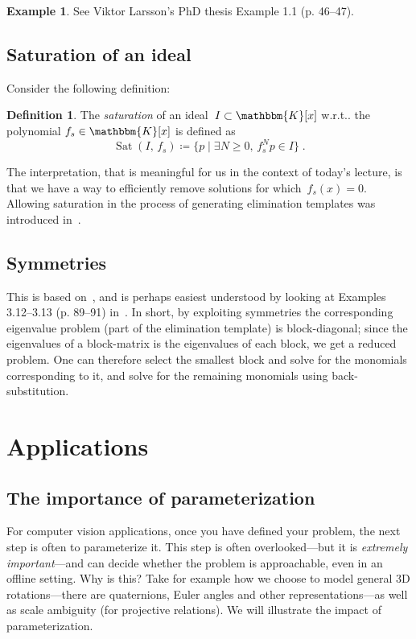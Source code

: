\documentclass[11pt,a4paper]{article}
\makeatletter
\theoremstyle{definition}
\newtheorem{example}{Example}
\newtheorem{definition}{Definition}
\newcommand{\K}{\ensuremath{\mathbbm{K}}}
\DeclareMathOperator{\sat}{Sat}
\DeclareRobustCommand\wrt{w.r.t\@ifnextchar.{}{.\@}}
\makeatother
\begin{document}
\begin{example}
See Viktor Larsson's PhD thesis Example 1.1 (p. 46--47).
\end{example}

\subsection{Saturation of an ideal}
Consider the following definition:
\begin{definition}
The \emph{saturation} of an ideal~$I\subset\K[x]$ \wrt{} the polynomial $f_s\in\K[x]$ is
defined as
\begin{equation}
    \sat(I,\, f_s) \coloneqq \{p\;|\;\exists N\geq 0,\, f_s^N p\in I  \}\;.
\end{equation}
\end{definition}
The interpretation, that is meaningful for us in the context of today's lecture, is that we
have a way to efficiently remove solutions for which~$f_s(x) =0$.
Allowing saturation in the process of generating elimination templates was introduced
in~\cite{larsson2017iccv}.

\subsection{Symmetries}
This is based on~\cite{larsson2016eccv}, and is perhaps easiest understood by looking
at Examples 3.12--3.13 (p. 89--91) in~\cite{larsson-phd}.
In short, by exploiting symmetries the corresponding eigenvalue problem (part of the
elimination template) is block-diagonal; since the eigenvalues of a block-matrix is
the eigenvalues of each block, we get a reduced problem. One can therefore select the smallest
block and solve for the monomials corresponding to it, and solve for the remaining monomials
using back-substitution.

\section{Applications}
\subsection{The importance of parameterization}
For computer vision applications, once you have defined your problem, the next step is often to
parameterize it. This step is often overlooked---but it is \emph{extremely important}---and can
decide whether the problem is approachable, even in an offline setting. Why is this? Take
for example how we choose to model general 3D rotations---there are quaternions, Euler angles
and other representations---as well as scale ambiguity (for projective relations).
We will illustrate the impact of
parameterization.
\end{document}

